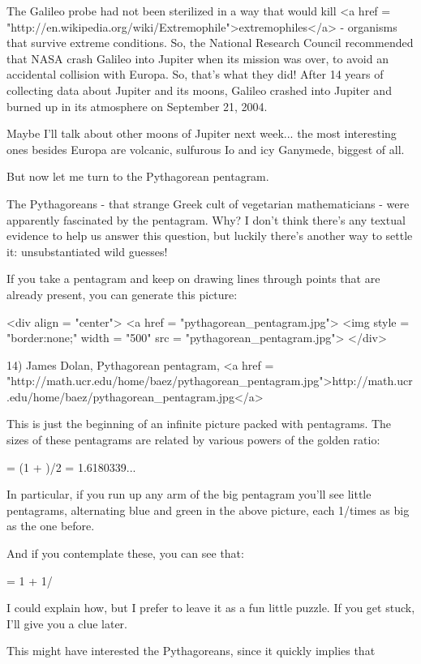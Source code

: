 The Galileo probe had not been sterilized in a way that would 
kill <a href = "http://en.wikipedia.org/wiki/Extremophile">extremophiles</a> 
- organisms that survive extreme conditions.
So, the National Research Council recommended that NASA crash 
Galileo into Jupiter when its mission was over, to avoid an 
accidental collision with Europa.  So, that's what they did!  
After 14 years of collecting data about Jupiter and its moons,
Galileo crashed into Jupiter and burned up in its atmosphere on 
September 21, 2004.

Maybe I'll talk about other moons of Jupiter next week... the
most interesting ones besides Europa are volcanic, sulfurous 
Io and icy Ganymede, biggest of all.

But now let me turn to the Pythagorean pentagram.

The Pythagoreans - that strange Greek cult of vegetarian 
mathematicians - were apparently fascinated by the pentagram. 
Why?  I don't think there's any textual evidence to help us answer
this question, but luckily there's another way to settle it: 
unsubstantiated wild guesses!

If you take a pentagram and keep on drawing lines through points 
that are already present, you can generate this picture:

<div align = "center">
<a href = "pythagorean_pentagram.jpg">
<img style = "border:none;" width = "500" src = "pythagorean_pentagram.jpg">
</div>

14) James Dolan, Pythagorean pentagram,
<a href = "http://math.ucr.edu/home/baez/pythagorean_pentagram.jpg">http://math.ucr.edu/home/baez/pythagorean_pentagram.jpg</a>

This is just the beginning of an infinite picture packed with pentagrams.  
The sizes of these pentagrams are related by various powers of the 
golden ratio:

\Phi  = (1 + )/2 = 1.6180339...

In particular, if you run up any arm of the big pentagram
you'll see little pentagrams, alternating blue and green
in the above picture, each 1/\Phi  times as big as the one before.

And if you contemplate these, you can see that:

\Phi  = 1 + 1/\Phi 

I could explain how, but I prefer to leave it as a fun little puzzle.
If you get stuck, I'll give you a clue later. 

This might have interested the Pythagoreans, since it quickly implies
that

